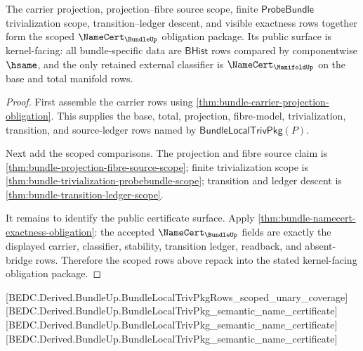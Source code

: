 \begin{theorem}
\label{thm:bundle-namecert-scoped-obligation-package}
The carrier projection, projection--fibre source scope, finite
$\mathsf{ProbeBundle}$ trivialization scope, transition--ledger descent, and
visible exactness rows together form the scoped
$\NameCert_{\BundleUp}$ obligation package. Its public surface is kernel-facing:
all bundle-specific data are $\mathsf{BHist}$ rows compared by componentwise
$\hsame$, and the only retained external classifier is
$\NameCert_{\ManifoldUp}$ on the base and total manifold rows.
\end{theorem}
\begin{proof}
First assemble the carrier rows using
\autoref{thm:bundle-carrier-projection-obligation}. This supplies the base,
total, projection, fibre-model, trivialization, transition, and source-ledger
rows named by $\mathsf{BundleLocalTrivPkg}(P)$.

Next add the scoped comparisons. The projection and fibre source claim is
\autoref{thm:bundle-projection-fibre-source-scope}; finite trivialization scope
is \autoref{thm:bundle-trivialization-probebundle-scope}; transition and ledger
descent is \autoref{thm:bundle-transition-ledger-scope}.

It remains to identify the public certificate surface. Apply
\autoref{thm:bundle-namecert-exactness-obligation}: the accepted
$\NameCert_{\BundleUp}$ fields are exactly the displayed carrier, classifier,
stability, transition ledger, readback, and absent-bridge rows. Therefore the
scoped rows above repack into the stated kernel-facing obligation package.
\end{proof}

[BEDC.Derived.BundleUp.BundleLocalTrivPkgRows\_scoped\_unary\_coverage]
[BEDC.Derived.BundleUp.BundleLocalTrivPkg\_semantic\_name\_certificate]
[BEDC.Derived.BundleUp.BundleLocalTrivPkg\_semantic\_name\_certificate]
[BEDC.Derived.BundleUp.BundleLocalTrivPkg\_semantic\_name\_certificate]


